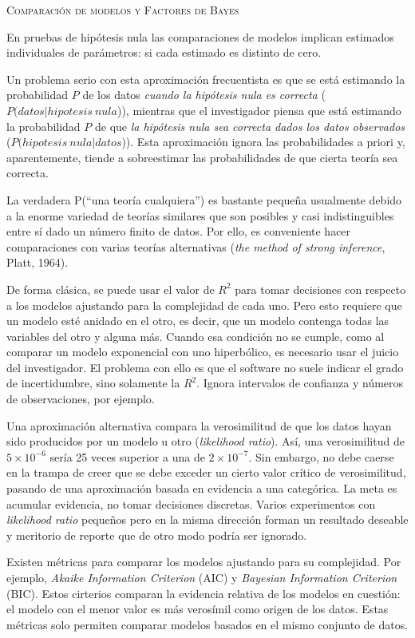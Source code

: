 \documentclass[a4paper,12pt]{article}
\begin{document}
{\scshape Comparación de modelos y Factores de Bayes}

En pruebas de hipótesis nula las comparaciones de modelos implican estimados individuales de parámetros: si cada estimado es distinto de cero.

Un problema serio con esta aproximación frecuentista es que se está estimando la probabilidad $P$ de los datos {\slshape cuando la hipótesis nula es correcta} ($P(datos|hipotesis\ nula$)), mientras que el investigador piensa que está estimando la probabilidad $P$ de que {\slshape la hipótesis nula sea correcta dados los datos observados} ($P(hipotesis\ nula|datos$)). Esta aproximación ignora las probabilidades a priori y, aparentemente, tiende a sobreestimar las probabilidades de que cierta teoría sea correcta.

La verdadera P(``una teoría cualquiera'') es bastante pequeña usualmente debido a la enorme variedad de teorías similares que son posibles y casi indistinguibles entre sí dado un número finito de datos. Por ello, es conveniente hacer comparaciones con varias teorías alternativas ({\slshape the method of strong inference}, Platt, 1964). 

De forma clásica, se puede usar el valor de $R^2$ para tomar decisiones con respecto a los modelos ajustando para la complejidad de cada uno. Pero esto requiere que un modelo esté anidado en el otro, es decir, que un modelo contenga todas las variables del otro y alguna más. Cuando esa condición no se cumple, como al comparar un modelo exponencial con uno hiperbólico, es necesario usar el juicio del investigador. El problema con ello es que el software no suele indicar el grado de incertidumbre, sino solamente la $R^2$. Ignora intervalos de confianza y números de observaciones, por ejemplo.

Una aproximación alternativa compara la verosimilitud de que los datos hayan sido producidos por un modelo u otro ({\slshape likelihood ratio}). Así, una verosimilitud de $5\times 10^{-6}$ sería 25 veces superior a una de $2\times 10^{-7}$. Sin embargo, no debe caerse en la trampa de creer que se debe exceder un cierto valor crítico de verosimilitud, pasando de una aproximación basada en evidencia a una categórica. La meta es acumular evidencia, no tomar decisiones discretas. Varios experimentos con {\slshape likelihood ratio} pequeños pero en la misma dirección forman un resultado deseable y meritorio de reporte que de otro modo podría ser ignorado.

Existen métricas para comparar los modelos ajustando para su complejidad. Por ejemplo, {\slshape Akaike Information Criterion} (AIC) y {\slshape Bayesian Information Criterion} (BIC). Estos cirterios comparan la evidencia relativa de los modelos en cuestión: el modelo con el menor valor es más verosímil como origen de los datos. Estas métricas solo permiten comparar modelos basados en el mismo conjunto de datos.
\end{document}
